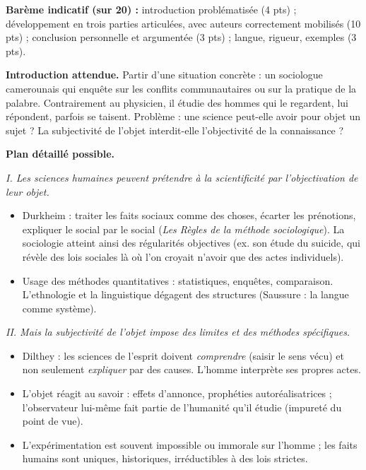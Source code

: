 \documentclass[11pt]{article}
\begin{document}
\begin{corrige}
\textbf{Barème indicatif (sur 20) :} introduction problématisée (4 pts) ; développement en trois parties articulées, avec auteurs correctement mobilisés (10 pts) ; conclusion personnelle et argumentée (3 pts) ; langue, rigueur, exemples (3 pts).

\textbf{Introduction attendue.} Partir d'une situation concrète : un sociologue camerounais qui enquête sur les conflits communautaires ou sur la pratique de la palabre. Contrairement au physicien, il étudie des hommes qui le regardent, lui répondent, parfois se taisent. Problème : une science peut-elle avoir pour objet un sujet ? La subjectivité de l'objet interdit-elle l'objectivité de la connaissance ?

\textbf{Plan détaillé possible.}

\emph{I. Les sciences humaines peuvent prétendre à la scientificité par l'objectivation de leur objet.}
\begin{itemize}
\item Durkheim : traiter les faits sociaux comme des choses, écarter les prénotions, expliquer le social par le social (\emph{Les Règles de la méthode sociologique}). La sociologie atteint ainsi des régularités objectives (ex. son étude du suicide, qui révèle des lois sociales là où l'on croyait n'avoir que des actes individuels).
\item Usage des méthodes quantitatives : statistiques, enquêtes, comparaison. L'ethnologie et la linguistique dégagent des structures (Saussure : la langue comme système).
\end{itemize}

\emph{II. Mais la subjectivité de l'objet impose des limites et des méthodes spécifiques.}
\begin{itemize}
\item Dilthey : les sciences de l'esprit doivent \emph{comprendre} (saisir le sens vécu) et non seulement \emph{expliquer} par des causes. L'homme interprète ses propres actes.
\item L'objet réagit au savoir : effets d'annonce, prophéties autoréalisatrices ; l'observateur lui-même fait partie de l'humanité qu'il étudie (impureté du point de vue).
\item L'expérimentation est souvent impossible ou immorale sur l'homme ; les faits humains sont uniques, historiques, irréductibles à des lois strictes.
\end{itemize}


\end{corrige}
\end{document}
